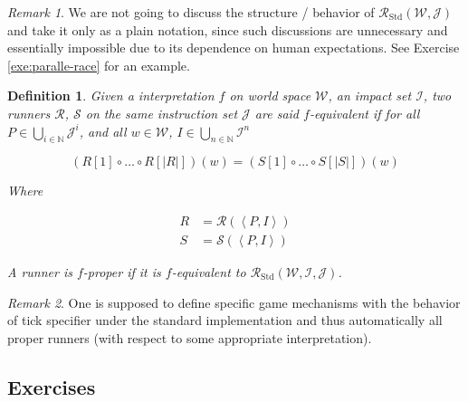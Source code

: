 \documentclass{book}
\newtheorem{definition}{Definition}
\theoremstyle{definition}\newtheorem{mechanism}{Mechanism}
\theoremstyle{remark}\newtheorem*{remark}{Remark}
\begin{document}
\begin{remark}
	We are not going to discuss the structure / behavior of $\mathcal R_{\mathrm{Std}}(\mathcal W, \mathcal J)$ and take it only as a plain notation, since such discussions are unnecessary and essentially impossible due to its dependence on human expectations. See Exercise \ref{exe:paralle-race} for an example.
\end{remark}

\begin{definition}
	Given a interpretation $f$ on world space $\mathcal W$, an impact set $\mathcal I$, two runners $\mathcal R$, $\mathcal S$ on the same instruction set $\mathcal J$ are said $f$-equivalent if for all $P \in \bigcup_{i\in \mathbb N} \mathcal J^i$, and all $w\in \mathcal W$, $I\in \bigcup_{n\in\mathbb N}\mathcal I^n$
	
	\begin{equation*}
		\left(R[1] \circ \dots \circ R[|R|]\right)(w) = \left(S[1] \circ \dots \circ S[|S|]\right)(w)
	\end{equation*}
	
	Where
	
	\begin{align*}
		R &= \mathcal R\left(\left<P, I\right>\right)\\
		S &= \mathcal S\left(\left<P, I\right>\right)
	\end{align*}
	
	A runner is $f$-proper if it is $f$-equivalent to $\mathcal R_{\mathrm{Std}}(\mathcal W, \mathcal I, \mathcal J)$.
\end{definition}

\begin{remark}
	One is supposed to define specific game mechanisms with the behavior of tick specifier under the standard implementation and thus automatically all proper runners (with respect to some appropriate interpretation).
\end{remark}

\subsection*{Exercises}
\end{document}
